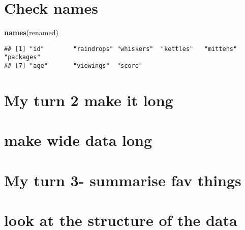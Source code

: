 \documentclass[]{article}
\newenvironment{Shaded}{\begin{snugshade}}{\end{snugshade}}
\newcommand{\DataTypeTok}[1]{\textcolor[rgb]{0.13,0.29,0.53}{#1}}
\newcommand{\KeywordTok}[1]{\textcolor[rgb]{0.13,0.29,0.53}{\textbf{#1}}}
\newcommand{\NormalTok}[1]{#1}
\newcommand{\OperatorTok}[1]{\textcolor[rgb]{0.81,0.36,0.00}{\textbf{#1}}}
\newcommand{\StringTok}[1]{\textcolor[rgb]{0.31,0.60,0.02}{#1}}
\begin{document}
\hypertarget{check-names}{%
\section{Check names}\label{check-names}}

\begin{Shaded}
\begin{Highlighting}[]
\KeywordTok{names}\NormalTok{(renamed)}
\end{Highlighting}
\end{Shaded}

\begin{verbatim}
## [1] "id"        "raindrops" "whiskers"  "kettles"   "mittens"   "packages" 
## [7] "age"       "viewings"  "score"
\end{verbatim}

\hypertarget{my-turn-2-make-it-long}{%
\section{My turn 2 make it long}\label{my-turn-2-make-it-long}}

\hypertarget{make-wide-data-long}{%
\section{make wide data long}\label{make-wide-data-long}}

\begin{Shaded}
\end{Shaded}

\hypertarget{my-turn-3--summarise-fav-things}{%
\section{My turn 3- summarise fav
things}\label{my-turn-3--summarise-fav-things}}

\hypertarget{look-at-the-structure-of-the-data}{%
\section{look at the structure of the
data}\label{look-at-the-structure-of-the-data}}
\end{document}

